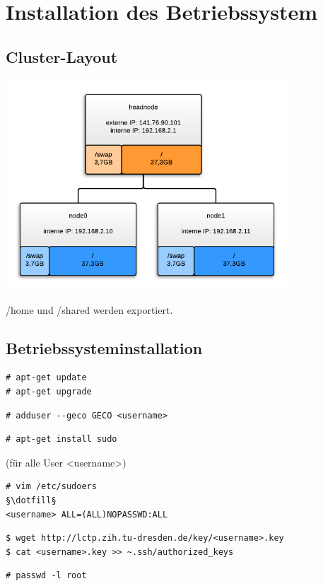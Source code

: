 \chapter{Installation des Betriebssystem}
\section{Cluster-Layout}
\includegraphics[width=400px]{cluster_layout.png}

/home und /shared werden exportiert.
\section{Betriebssysteminstallation}
\begin{lstlisting}[style=Bash]
# apt-get update 
# apt-get upgrade 
\end{lstlisting}
\begin{lstlisting}[style=Bash]
# adduser --geco GECO <username>
\end{lstlisting}
\begin{lstlisting}[style=Bash]
# apt-get install sudo
\end{lstlisting}
(für alle User <username>)
\begin{lstlisting}[style=Bash]
# vim /etc/sudoers
§\dotfill§
<username> ALL=(ALL)NOPASSWD:ALL
\end{lstlisting}
\begin{lstlisting}[style=Bash]
$ wget http://lctp.zih.tu-dresden.de/key/<username>.key
$ cat <username>.key >> ~.ssh/authorized_keys
\end{lstlisting}
\begin{lstlisting}[style=Bash]
# passwd -l root 
\end{lstlisting}

